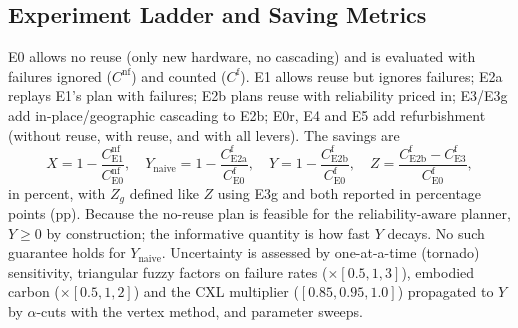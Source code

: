 \documentclass{article} %
\begin{document}
\subsection{Experiment Ladder and Saving Metrics}
\label{sec:method_ladder}
\label{sec:method_uq}
E0 allows no reuse (only new hardware, no cascading) and is evaluated with failures ignored ($C^{\text{nf}}$) and counted ($C^{\text{f}}$). E1 allows reuse but ignores failures; E2a replays E1's plan with failures; E2b plans reuse with reliability priced in; E3/E3g add in-place/geographic cascading to E2b; E0r, E4 and E5 add refurbishment (without reuse, with reuse, and with all levers). The savings are
\begin{equation}
X = 1-\frac{C^{\text{nf}}_{\text{E1}}}{C^{\text{nf}}_{\text{E0}}}, \quad
Y_{\text{naive}} = 1-\frac{C^{\text{f}}_{\text{E2a}}}{C^{\text{f}}_{\text{E0}}}, \quad
Y = 1-\frac{C^{\text{f}}_{\text{E2b}}}{C^{\text{f}}_{\text{E0}}}, \quad
Z = \frac{C^{\text{f}}_{\text{E2b}} - C^{\text{f}}_{\text{E3}}}{C^{\text{f}}_{\text{E0}}},
\label{eq:savings}
\end{equation}
in percent, with $Z_g$ defined like $Z$ using E3g and both reported in percentage points (pp). Because the no-reuse plan is feasible for the reliability-aware planner, $Y \ge 0$ by construction; the informative quantity is how fast $Y$ decays. No such guarantee holds for $Y_{\text{naive}}$. Uncertainty is assessed by one-at-a-time (tornado) sensitivity, triangular fuzzy factors on failure rates ($\times[0.5,1,3]$), embodied carbon ($\times[0.5,1,2]$) and the CXL multiplier ($[0.85,0.95,1.0]$) propagated to $Y$ by $\alpha$-cuts with the vertex method, and parameter sweeps.
\end{document}
